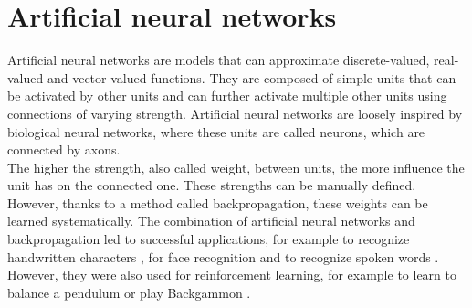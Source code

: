 \section{Artificial neural networks} %
\label{sec:artificial_neural_networks}
Artificial neural networks are models that can approximate discrete-valued, real-valued and vector-valued functions.
They are composed of simple units that can be activated by other units and can further activate multiple other units using connections of varying strength.
Artificial neural networks are loosely inspired by biological neural networks, where these units are called neurons, which are connected by axons.\\
The higher the strength, also called weight, between units, the more influence the unit has on the connected one. These strengths can be manually defined. However, thanks to a method called backpropagation, these weights can be learned systematically. The combination of artificial neural networks and backpropagation led to successful applications, for example to recognize handwritten characters \citep{journals/neco/LeCunBDHHHJ89}, for face recognition \citep{cottrell1990extracting} and to recognize spoken words \citep{journals/nn/LangWH90}. However, they were also used for reinforcement learning, for example to learn to balance a pendulum \citep{anderson:ieeecsm89} or play Backgammon \citep{Tesauro:92}.

